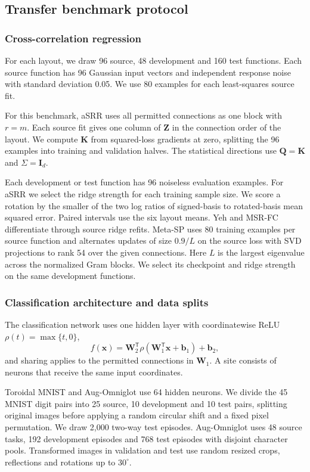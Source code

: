 \subsection{Transfer benchmark protocol}
\label{app:transfer-details}

\subsubsection{Cross-correlation regression}

For each layout, we draw 96 source, 48 development and 160 test
functions. Each source function has 96 Gaussian input vectors and
independent response noise with standard deviation 0.05. We use 80
examples for each least-squares source fit.

For this benchmark, aSRR uses all permitted connections as one block
with $r=m$. Each source fit gives one column of $\mathbf Z$ in the
connection order of the layout. We compute $\mathbf K$ from squared-loss
gradients at zero, splitting the 96 examples into training and validation
halves. The statistical directions use $\mathbf Q=\mathbf K$ and
$\Sigma=\mathbf I_d$.

Each development or test function has 96 noiseless evaluation
examples. For aSRR we select the ridge strength for each training sample
size. We score a rotation by the smaller of the two log ratios of
signed-basis to rotated-basis mean squared error. Paired intervals use
the six layout means. Yeh and MSR-FC differentiate through source
ridge refits.
Meta-SP uses 80 training examples per source function and alternates
updates of size $0.9/L$ on the source loss with SVD projections to rank
54 over the given connections. Here $L$ is the largest eigenvalue
across the normalized Gram blocks. We select its checkpoint and ridge
strength on the same development functions.

\subsubsection{Classification architecture and data splits}

The classification network uses one hidden layer with coordinatewise
ReLU $\rho(t)=\max\{t,0\}$,
\[
    f(\mathbf x)=\mathbf W_2^{\mathsf T}
        \rho(\mathbf W_1^{\mathsf T}\mathbf x+\mathbf b_1)+\mathbf b_2,
\]
and sharing applies to the permitted connections in $\mathbf W_1$.
A site consists of neurons that receive the same input coordinates.

Toroidal MNIST and Aug-Omniglot use 64 hidden neurons. We divide the 45
MNIST digit pairs into 25 source, 10 development and 10 test pairs,
splitting original images before applying a random circular shift and
a fixed pixel permutation. We draw 2,000 two-way test episodes.
Aug-Omniglot uses 48 source tasks, 192 development episodes and 768
test episodes with disjoint character pools. Transformed images in
validation and test use random resized crops, reflections and rotations up
to $30^\circ$.

